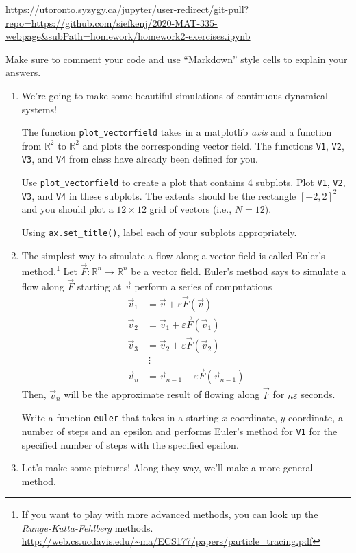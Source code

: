 \documentclass[letter]{article}
\newcommand{\R}{\mathbb{R}}
\begin{document}
	\url{https://utoronto.syzygy.ca/jupyter/user-redirect/git-pull?repo=https://github.com/siefkenj/2020-MAT-335-webpage&subPath=homework/homework2-exercises.ipynb}

	Make sure to comment your code and use ``Markdown'' style cells to explain your answers.

	\begin{enumerate}
		\item We're going to make some beautiful simulations of continuous dynamical systems!

			The function \verb|plot_vectorfield| takes in a matplotlib \emph{axis} and a function from $\R^2$ to $\R^2$
			and plots the corresponding vector field. The functions {\tt V1}, {\tt V2}, {\tt V3}, and {\tt V4} from class
			have already been defined for you.

			Use \verb|plot_vectorfield| to create a plot that contains 4 subplots. Plot {\tt V1}, {\tt V2}, {\tt V3}, and {\tt V4}
			in these subplots. The extents should be the rectangle $[-2,2]^2$ and you should plot a $12\times 12$ grid of vectors
			(i.e., $N=12$).

			Using \verb|ax.set_title()|, label each of your subplots appropriately.
		\item The simplest way to simulate a flow along a vector field is called Euler's method.\footnote{If you want to play with more advanced
			methods, you can look up the \emph{Runge-Kutta-Fehlberg} methods. \url{http://web.cs.ucdavis.edu/~ma/ECS177/papers/particle_tracing.pdf}}
			Let $\vec F:\R^n\to\R^n$ be a vector field. Euler's method says to simulate a flow along $\vec F$ starting at $\vec v$
			perform a series of computations
			\begin{align*}
				\vec v_1 &= \vec v + \varepsilon \vec F(\vec v)\\
				\vec v_2 &= \vec v_1 + \varepsilon \vec F(\vec v_1)\\
				\vec v_3 &= \vec v_2 + \varepsilon \vec F(\vec v_2)\\
				&~\vdots\\
				\vec v_n &= \vec v_{n-1} + \varepsilon \vec F(\vec v_{n-1})
			\end{align*}
			Then, $\vec v_n$ will be the approximate result of flowing along $\vec F$ for $n\varepsilon$ seconds.

			Write a function {\tt euler} that takes in a starting $x$-coordinate, $y$-coordinate, a number of steps and an epsilon
			and performs Euler's method for {\tt V1} for the specified number of steps with the specified epsilon.
		\item Let's make some pictures! Along they way, we'll make a more general method.


\end{enumerate}
\end{document}
